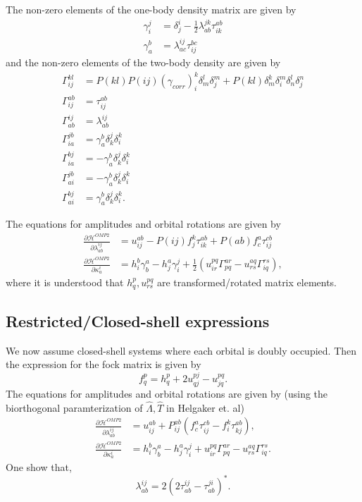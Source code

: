 \documentclass[10pt,a4paper]{article}
\begin{document}
The non-zero elements of the one-body density matrix are given by 
\begin{align}
\gamma_i^j &= \delta^i_j - \frac{1}{2} \lambda^{jk}_{ab} \tau^{ab}_{ik} \\
\gamma_a^b &= \lambda^{ij}_{ac}\tau^{bc}_{ij}
\end{align}
and the non-zero elements of the two-body density are given by 
\begin{align}
\Gamma^{kl}_{ij} &= P(kl)P(ij) (\gamma_{corr})_i^k \delta^l_m \delta^m_j + P(kl)\delta^k_m\delta^m_i\delta^l_n\delta^n_j \\
\Gamma^{ab}_{ij} &= \tau^{ab}_{ij} \\
\Gamma^{ij}_{ab} &= \lambda^{ij}_{ab} \\
\Gamma^{jb}_{ia} &= \gamma^b_a \delta^j_k\delta^k_i \\
\Gamma^{bj}_{ia} &= -\gamma^b_a \delta^j_k\delta^k_i \\
\Gamma^{jb}_{ai} &= -\gamma^b_a \delta^j_k\delta^k_i \\
\Gamma^{bj}_{ai} &= \gamma^b_a \delta^j_k\delta^k_i. 
\end{align}

The equations for amplitudes and orbital rotations are given by 
\begin{align}
\frac{\partial \mathcal{H}^{OMP2}}{\partial \lambda^{ij}_{ab}} &= u^{ab}_{ij} - P(ij)f^k_j \tau^{ab}_{ik} + P(ab)f^a_c \tau^{cb}_{ij} \\
\frac{\partial \mathcal{H}^{OMP2}}{\partial \kappa^i_a} &= h^b_i \gamma^a_b - h^a_j \gamma^j_i + \frac{1}{2} \left( u^{pq}_{ir}\Gamma^{ar}_{pq}-u^{aq}_{rs}\Gamma^{rs}_{iq} \right),
\end{align}
where it is understood that $h^p_q, u^{pq}_{rs}$ are transformed/rotated matrix elements.

\subsection{Restricted/Closed-shell expressions}
We now assume closed-shell systems where each orbital is doubly occupied. Then the expression for the fock matrix is given by
\begin{equation}
f^p_q = h^p_q + 2u^{pj}_{qj}-u^{pq}_{jq}.
\end{equation}
The equations for amplitudes and orbital rotations are given by (using the biorthogonal paramterization of $\hat{\Lambda}, \hat{T}$ in Helgaker et. al) 
\begin{align}
\frac{\partial \mathcal{H}^{OMP2}}{\partial \lambda^{ij}_{ab}} &= u^{ab}_{ij} + P^{ab}_{ij} \left( f^a_c \tau^{cb}_{ij} - f^k_i \tau^{ab}_{kj} \right),  \\
\frac{\partial \mathcal{H}^{OMP2}}{\partial \kappa^i_a} &= h^b_i \gamma^a_b - h^a_j \gamma^j_i +  u^{pq}_{ir}\Gamma^{ar}_{pq}-u^{aq}_{rs}\Gamma^{rs}_{iq}.
\end{align}
One show that, 
\begin{equation}
\lambda^{ij}_{ab} = 2(2\tau^{ij}_{ab}-\tau^{ji}_{ab})^*.
\end{equation}
\end{document}
